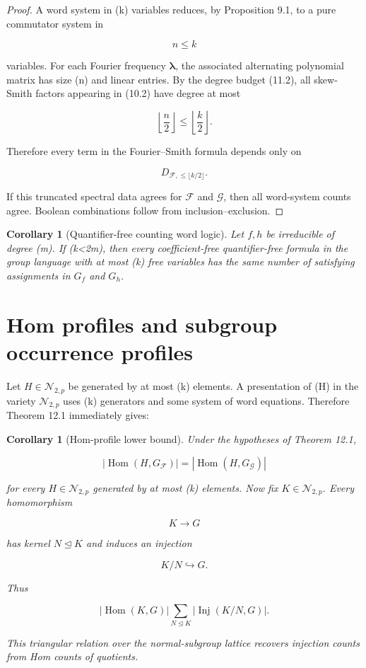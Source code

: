 \documentclass[11pt]{article}
\newtheorem{corollary}[theorem]{Corollary}
\begin{document}
\begin{proof}
A word system in (k) variables reduces, by Proposition 9.1, to a pure commutator system in

\[
n\le k
\]

variables. For each Fourier frequency $\boldsymbol\lambda$, the associated alternating polynomial matrix has size (n) and linear entries. By the degree budget (11.2), all skew-Smith factors appearing in (10.2) have degree at most

\[
\left\lfloor\frac n2\right\rfloor
\le
\left\lfloor\frac k2\right\rfloor.
\]

Therefore every term in the Fourier--Smith formula depends only on

\[
D_{\mathcal F,\le \lfloor k/2\rfloor}.
\]

If this truncated spectral data agrees for $\mathcal F$ and $\mathcal G$, then all word-system counts agree. Boolean combinations follow from inclusion--exclusion.

\end{proof}

\begin{corollary}[Quantifier-free counting word logic]
Let $f,h$ be irreducible of degree (m). If (k<2m), then every coefficient-free quantifier-free formula in the group language with at most (k) free variables has the same number of satisfying assignments in $G_f$ and $G_h$.

\end{corollary}

\section{Hom profiles and subgroup occurrence profiles}

Let $H\in\mathcal N_{2,p}$ be generated by at most (k) elements. A presentation of (H) in the variety $\mathcal N_{2,p}$ uses (k) generators and some system of word equations. Therefore Theorem 12.1 immediately gives:

\begin{corollary}[Hom-profile lower bound]
Under the hypotheses of Theorem 12.1,

\[
|\operatorname{Hom}(H,G_{\mathcal F})|
=|\operatorname{Hom}(H,G_{\mathcal G})|
\]

for every $H\in\mathcal N_{2,p}$ generated by at most (k) elements. Now fix $K\in\mathcal N_{2,p}$. Every homomorphism

\[
K\to G
\]

has kernel $N\trianglelefteq K$ and induces an injection

\[
K/N\hookrightarrow G.
\]

Thus

\[
|\operatorname{Hom}(K,G)|
\sum_{N\trianglelefteq K}
|\operatorname{Inj}(K/N,G)|.
\tag{13.1}
\]

This triangular relation over the normal-subgroup lattice recovers injection counts from Hom counts of quotients.

\end{corollary}
\end{document}
